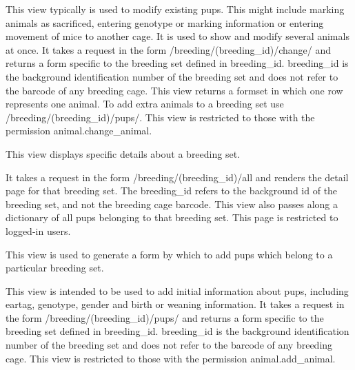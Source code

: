 \documentclass[letterpaper,10pt,english]{sphinxmanual}
\begin{document}
\begin{fulllineitems}
\begin{fulllineitems}
This view typically is used to modify existing pups.  This might include marking animals as sacrificed, entering genotype or marking information or entering movement of mice to another cage.  It is used to show and modify several animals at once.
It takes a request in the form /breeding/(breeding\_id)/change/ and returns a form specific to the breeding set defined in breeding\_id.  breeding\_id is the background identification number of the breeding set and does not refer to the barcode of any breeding cage.
This view returns a formset in which one row represents one animal.  To add extra animals to a breeding set use /breeding/(breeding\_id)/pups/.
This view is restricted to those with the permission animal.change\_animal.

\end{fulllineitems}


\begin{fulllineitems}
\label{api:animal.views.breeding_detail}
This view displays specific details about a breeding set.

It takes a request in the form /breeding/(breeding\_id)/all and renders the detail page for that breeding set.
The breeding\_id refers to the background id of the breeding set, and not the breeding cage barcode.
This view also passes along a dictionary of all pups belonging to that breeding set.
This page is restricted to logged-in users.

\end{fulllineitems}


\begin{fulllineitems}
\label{api:animal.views.breeding_pups}
This view is used to generate a form by which to add pups which belong to a particular breeding set.

This view is intended to be used to add initial information about pups, including eartag, genotype, gender and birth or weaning information.
It takes a request in the form /breeding/(breeding\_id)/pups/ and returns a form specific to the breeding set defined in breeding\_id.  breeding\_id is the background identification number of the breeding set and does not refer to the barcode of any breeding cage.
This view is restricted to those with the permission animal.add\_animal.


\end{fulllineitems}
\end{fulllineitems}
\end{document}
